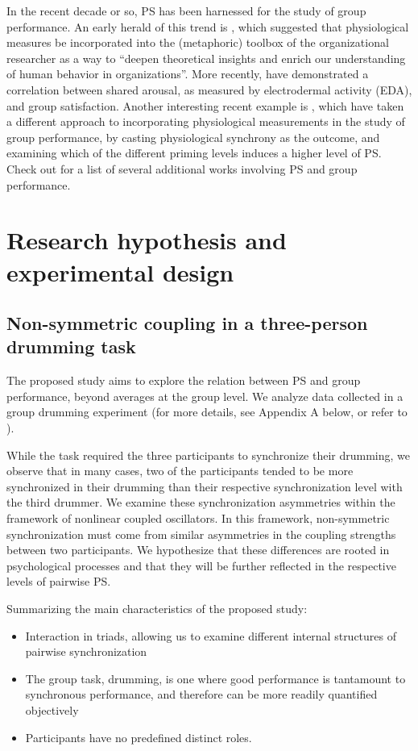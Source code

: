 \documentclass[a4paper, 11pt]{report}      %
\begin{document}
In the recent decade or so, PS has been harnessed for the study of group performance. An early herald of this trend is \citet{akinola2010measuring}, which suggested that physiological measures be incorporated into the (metaphoric) toolbox of the organizational researcher as a way to \enquote{deepen theoretical insights and enrich our understanding of human behavior in organizations}. More recently,  \citet{chikersal2017deep} have demonstrated a correlation between shared arousal, as measured by electrodermal activity (EDA), and group satisfaction. Another interesting recent example is \citet{danyluck2018intergroup}, which have taken a different approach to incorporating physiological measurements in the study of group performance, by casting physiological synchrony as the outcome, and examining which of the different priming levels induces a higher level of PS. Check out \citet{jar202physiological} for a list of several additional works involving PS and group performance.



\section{Research hypothesis and experimental design}
\subsection{Non-symmetric coupling in a three-person drumming task}

The proposed study aims to explore the relation between PS and group performance, beyond averages at the group level. We analyze data collected in a group drumming experiment (for more details, see Appendix A below, or refer to \cite{gordon2020physio}). 

While the task required the three participants to synchronize their drumming, we observe that in many cases, two of the participants tended to be more synchronized in their drumming than their respective synchronization level with the third drummer.
We examine these synchronization asymmetries within the framework of nonlinear coupled oscillators. In this framework, non-symmetric synchronization must come from  similar asymmetries in the coupling strengths between two participants. We hypothesize that these differences are rooted in psychological processes and that they will be further reflected in the respective levels of pairwise PS.

Summarizing the main characteristics of the proposed study:
\begin{itemize}
    \item Interaction in triads, allowing us to examine different internal structures of pairwise synchronization
    \item The group task, drumming, is one where good performance is tantamount to synchronous performance, and therefore can be more readily quantified objectively
    \item Participants have no predefined distinct roles.
\end{itemize}
\end{document}
